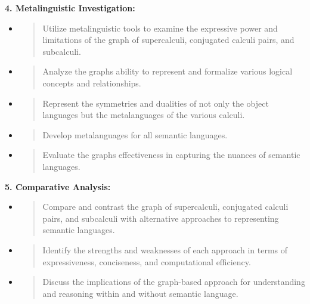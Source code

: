 \textbf{4. Metalinguistic Investigation:}

\begin{itemize}
\item
  \begin{quote}
  Utilize metalinguistic tools to examine the expressive power and
  limitations of the graph of supercalculi, conjugated calculi pairs,
  and subcalculi.
  \end{quote}
\item
  \begin{quote}
  Analyze the graph\textquotesingle s ability to represent and formalize
  various logical concepts and relationships.
  \end{quote}
\item
  \begin{quote}
  Represent the symmetries and dualities of not only the object
  languages but the metalanguages of the various calculi.
  \end{quote}
\item
  \begin{quote}
  Develop metalanguages for all semantic languages.
  \end{quote}
\item
  \begin{quote}
  Evaluate the graph\textquotesingle s effectiveness in capturing the
  nuances of semantic languages.
  \end{quote}
\end{itemize}

\textbf{5. Comparative Analysis:}

\begin{itemize}
\item
  \begin{quote}
  Compare and contrast the graph of supercalculi, conjugated calculi
  pairs, and subcalculi with alternative approaches to representing
  semantic languages.
  \end{quote}
\item
  \begin{quote}
  Identify the strengths and weaknesses of each approach in terms of
  expressiveness, conciseness, and computational efficiency.
  \end{quote}
\item
  \begin{quote}
  Discuss the implications of the graph-based approach for understanding
  and reasoning within and without semantic language.
  \end{quote}
\end{itemize}

